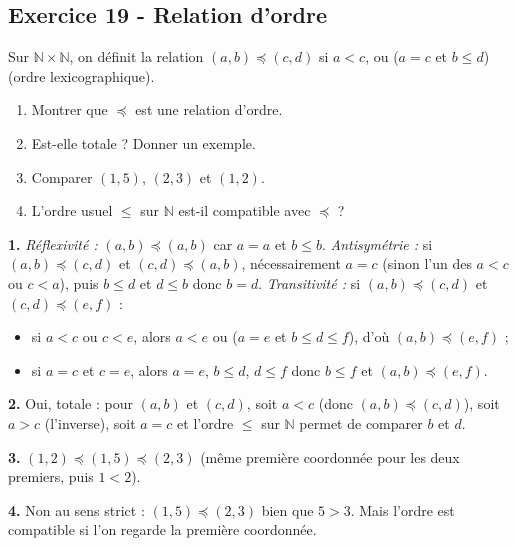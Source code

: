 \documentclass[12pt,a4paper]{article}
\begin{document}
\subsection*{Exercice 19 - Relation d'ordre \niveau{\moyen}}

\begin{boiteexercice}
Sur $\mathbb{N}\times\mathbb{N}$, on définit la relation $(a,b)\preccurlyeq (c,d)$ si $a < c$, ou ($a = c$ et $b\leq d$) (ordre lexicographique).
\begin{enumerate}
  \item Montrer que $\preccurlyeq$ est une relation d'ordre.
  \item Est-elle totale ? Donner un exemple.
  \item Comparer $(1,5)$, $(2,3)$ et $(1,2)$.
  \item L'ordre usuel $\leq$ sur $\mathbb{N}$ est-il compatible avec $\preccurlyeq$ ?
\end{enumerate}
\end{boiteexercice}

\begin{boitecorrige}
\textbf{1.}
\textit{Réflexivité :} $(a,b)\preccurlyeq(a,b)$ car $a=a$ et $b\leq b$.
\textit{Antisymétrie :} si $(a,b)\preccurlyeq(c,d)$ et $(c,d)\preccurlyeq(a,b)$, nécessairement $a=c$ (sinon l'un des $a<c$ ou $c<a$), puis $b\leq d$ et $d\leq b$ donc $b=d$.
\textit{Transitivité :} si $(a,b)\preccurlyeq(c,d)$ et $(c,d)\preccurlyeq(e,f)$ :
\begin{itemize}[nosep]
  \item si $a<c$ ou $c<e$, alors $a<e$ ou ($a=e$ et $b\leq d\leq f$), d'où $(a,b)\preccurlyeq(e,f)$ ;
  \item si $a=c$ et $c=e$, alors $a=e$, $b\leq d$, $d\leq f$ donc $b\leq f$ et $(a,b)\preccurlyeq(e,f)$.
\end{itemize}

\textbf{2.} Oui, totale : pour $(a,b)$ et $(c,d)$, soit $a<c$ (donc $(a,b)\preccurlyeq(c,d)$), soit $a>c$ (l'inverse), soit $a=c$ et l'ordre $\leq$ sur $\mathbb{N}$ permet de comparer $b$ et $d$.

\textbf{3.} $(1,2) \preccurlyeq (1,5) \preccurlyeq (2,3)$ (même première coordonnée pour les deux premiers, puis $1<2$).

\textbf{4.} Non au sens strict : $(1,5)\preccurlyeq(2,3)$ bien que $5 > 3$. Mais l'ordre est compatible si l'on regarde la première coordonnée.
\end{boitecorrige}
\end{document}
